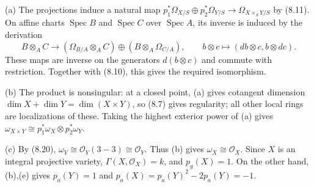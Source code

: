 (a) The projections induce a natural map $p_1^*\Omega_{X/S}\oplus p_2^*\Omega_{Y/S}\to\Omega_{X\times_S Y/S}$ by (8.11). On affine charts $\operatorname{Spec}B$ and $\operatorname{Spec}C$ over $\operatorname{Spec}A$, its inverse is induced by the derivation
\[B\otimes_A C\to(\Omega_{B/A}\otimes_A C)\oplus(B\otimes_A\Omega_{C/A}),\qquad b\otimes c\mapsto(db\otimes c,b\otimes dc).\]
These maps are inverse on the generators $d(b\otimes c)$ and commute with restriction. Together with (8.10), this gives the required isomorphism.

(b) The product is nonsingular: at a closed point, (a) gives cotangent dimension $\dim X+\dim Y=\dim(X\times Y)$, so (8.7) gives regularity; all other local rings are localizations of these. Taking the highest exterior power of (a) gives $\omega_{X\times Y}\cong p_1^*\omega_X\otimes p_2^*\omega_Y$.

(c) By (8.20), $\omega_Y\cong\mathcal O_Y(3-3)\cong\mathcal O_Y$. Thus (b) gives $\omega_X\cong\mathcal O_X$. Since $X$ is an integral projective variety, $\Gamma(X,\mathcal O_X)=k$, and $p_g(X)=1$. On the other hand, (b),(e) gives $p_a(Y)=1$ and $p_a(X)=p_a(Y)^2-2p_a(Y)=-1$.
